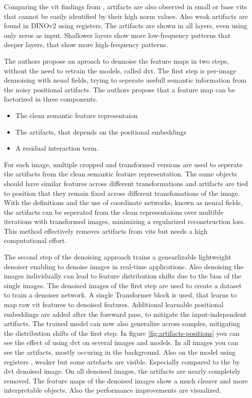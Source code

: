 \documentclass[conference]{IEEEtran}
\begin{document}
  Comparing the \ac{vit} findings from \cite{registers}, artifacts are also observed in small or base \acp{vit} that cannot be easily identified by their high norm values. Also weak artifacts are found in \mbox{DINOv2} using registers. The artifacts are shown in all layers, even using only zeros as input. Shallower layers show more low-frequency patterns that deeper layers, that show more high-frequency patterns.

  The authors propose an aproach to dennoise the feature maps in two steps, without the need to retrain the models, called \acf{dvt}. The first step is per-image dennoising with neual fields, trying to seperate usefull semantic information from the noisy positional artifacts. The authors propose that a feature map can be factorized in three components.
  \begin{itemize}
    \item The clean semantic feature representaion
    \item The artifacts, that depends on the positional embeddings
    \item A residual interaction term.
  \end{itemize}

  For each image, multiple cropped and transformed versions are used to seperate the artifacts from the clean semantic feature representation. The same objects should have similar features across different transformations and artifacts are tied to position that they remain fixed across different transfomations of the image. With the definitions and the use of coordinate networks, known as neural fields, the artifacts can be seperated from the clean representaions over multible iterations with transformed images, minimizing a regularized reconstruction loss. This method effectively removes artifacts from \acp{vit} but needs a high computational effort.

  The second step of the denoising approach trains a genearlizable lightweight denoiser enabling to denoise images in real-time applications. Also denoising the images individually can lead to feature distribution shifts due to the bias of the single images. The denoised images of the first step are used to create a dataset to train a denoiser network. A single Transformer block is used, that learns to map raw \ac{vit} features to denoised features. Additional learnable positional embeddings are added after the foreward pass, to mitigate the input-independent artifacts. The trained model can now also generalize across samples, mitigating the distribution shifts of the first step. In figure \ref{fig:artifacts-positions} you can see the effect of using \ac{dvt} on several images and models. In all images you can see the artifacts, mostly occuring in the background. Also on the model using registers \cite{registers}, weaker but some artefacts are visible. Especially compared to the by \ac{dvt} denoised image. On all denoised images, the artifacts are nearly completely removed. The feature maps of the denoised images show a much clearer and more interpretable objects. Also the performance improvements are visualized. \cite{denoising}
\end{document}
